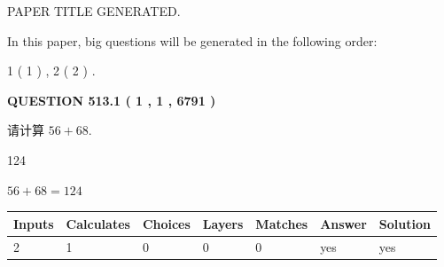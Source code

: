 \documentclass{ctexart}
\begin{document}
   
 \vspace{0.2in}
 
 
 
 
   
   
 PAPER TITLE GENERATED.
   
   
   
\vspace{0.2in}
   
In this paper, big questions will be generated in the following order: 
   
   
   1 ( 1 )
 ,
   2 ( 2 )
 .
  
\vspace{0.2in}
  
{\textbf{\Large{QUESTION
513.1 
 ( 1 , 1 , 6791 )
}}}
  
  
 
请计算 $ %
56 +  %
68 $.
 
 
 
\noindent{}
 
 

124
 
 
\noindent{}
 
 

 
 
 
\noindent{}
 
 

$ %
56 +  %
68=   %
124$
 
 
\noindent{}
 
 

 
   
   
   
   
\noindent\begin{tabular}{|l|l|l|l|l|l|l|}
 \hline
Inputs & Calculates & Choices & Layers & Matches & Answer & Solution \\ \hline
 2  & 
 1  & 
 0
  & 
 0  & 
 0  & 
  yes & 
  yes 
  \\ \hline
 \end{tabular}
   
   
   
   
\noindent{}
   
   
  
\end{document}
